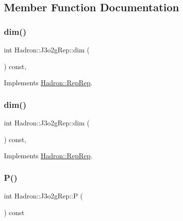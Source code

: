 \subsection{Member Function Documentation}
\mbox{\label{structHadron_1_1J3o2gRep_af7221b9d11d215d51a39f93dc0dfaf88}} 
\subsubsection{\texorpdfstring{dim()}{dim()}\hspace{0.1cm}{\footnotesize\ttfamily [1/2]}}
{\footnotesize\ttfamily int Hadron\+::\+J3o2g\+Rep\+::dim (\begin{DoxyParamCaption}{ }\end{DoxyParamCaption}) const\hspace{0.3cm}{\ttfamily [inline]}, {\ttfamily [virtual]}}



Implements \mbox{\hyperlink{structHadron_1_1RepRep_a92c8802e5ed7afd7da43ccfd5b7cd92b}{Hadron\+::\+Rep\+Rep}}.

\mbox{\label{structHadron_1_1J3o2gRep_af7221b9d11d215d51a39f93dc0dfaf88}} 
\subsubsection{\texorpdfstring{dim()}{dim()}\hspace{0.1cm}{\footnotesize\ttfamily [2/2]}}
{\footnotesize\ttfamily int Hadron\+::\+J3o2g\+Rep\+::dim (\begin{DoxyParamCaption}{ }\end{DoxyParamCaption}) const\hspace{0.3cm}{\ttfamily [inline]}, {\ttfamily [virtual]}}



Implements \mbox{\hyperlink{structHadron_1_1RepRep_a92c8802e5ed7afd7da43ccfd5b7cd92b}{Hadron\+::\+Rep\+Rep}}.

\mbox{\label{structHadron_1_1J3o2gRep_a52046d4b4dfe6708dfd95c7477fa09ae}} 
\subsubsection{\texorpdfstring{P()}{P()}\hspace{0.1cm}{\footnotesize\ttfamily [1/2]}}
{\footnotesize\ttfamily int Hadron\+::\+J3o2g\+Rep\+::P (\begin{DoxyParamCaption}{ }\end{DoxyParamCaption}) const\hspace{0.3cm}{\ttfamily [inline]}}

